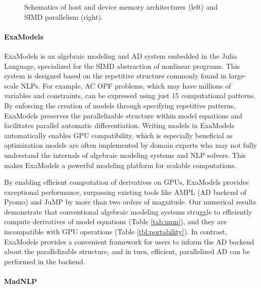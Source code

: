 \begin{figure}[t]
{
  }
  \caption{Schematics of host and device memory architectures (left) and SIMD parallelism (right).}
  \label{fig:simd}
\end{figure}


\paragraph{ExaModels}

ExaModels is an algebraic modeling and AD system embedded in the Julia
Language, specialized for the SIMD abstraction of nonlinear
programs. This system is designed based on the repetitive structure
commonly found in large-scale NLPs. For example, AC OPF problems,
which may have millions of variables and constraints, can be expressed
using just 15 computational patterns. By enforcing the creation of
models through specifying repetitive patterns, ExaModels preserves the
parallelizable structure within model equations and facilitates
parallel automatic differentiation. Writing models in ExaModels
automatically enables GPU compatibility, which is especially
beneficial as optimization models are often implemented by domain
experts who may not fully understand the internals of algebraic
modeling systems and NLP solvers.  This makes ExaModels a powerful
modeling platform for scalable computations.


By enabling efficient computation of derivatives on GPUs, ExaModels
provides exceptional performance, surpassing existing tools like AMPL
(AD backend of Pyomo) and JuMP by more than two orders of
magnitude. Our numerical results demonstrate that conventional
algebraic modeling systems struggle to efficiently compute derivatives
of model equations (Table \ref{tab:num}), and they are incompatible
with GPU operations (Table \ref{tbl:portability}). In contrast,
ExaModels provides a convenient framework for users to inform the AD
backend about the parallelizable structure, and in turn, efficient,
parallelized AD can be performed in the backend.


\paragraph{MadNLP}

